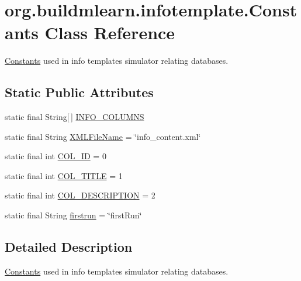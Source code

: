 \hypertarget{classorg_1_1buildmlearn_1_1infotemplate_1_1Constants}{}\section{org.\+buildmlearn.\+infotemplate.\+Constants Class Reference}
\label{classorg_1_1buildmlearn_1_1infotemplate_1_1Constants}


\hyperlink{classorg_1_1buildmlearn_1_1infotemplate_1_1Constants}{Constants} used in info template\textquotesingle{}s simulator relating databases.  


\subsection*{Static Public Attributes}
\begin{DoxyCompactItemize}
\item 
static final String\mbox{[}$\,$\mbox{]} \hyperlink{classorg_1_1buildmlearn_1_1infotemplate_1_1Constants_ab3f048dc159aa767ce63e2f4732ce323}{I\+N\+F\+O\+\_\+\+C\+O\+L\+U\+M\+NS}
\item 
static final String \hyperlink{classorg_1_1buildmlearn_1_1infotemplate_1_1Constants_a22968d39912d481f05334917ee2534a1}{X\+M\+L\+File\+Name} = \char`\"{}info\+\_\+content.\+xml\char`\"{}
\item 
static final int \hyperlink{classorg_1_1buildmlearn_1_1infotemplate_1_1Constants_acc412bcdafb8b030cc8054d02579ca63}{C\+O\+L\+\_\+\+ID} = 0
\item 
static final int \hyperlink{classorg_1_1buildmlearn_1_1infotemplate_1_1Constants_ae2a4192623b0846f515eb1e74e7ce486}{C\+O\+L\+\_\+\+T\+I\+T\+LE} = 1
\item 
static final int \hyperlink{classorg_1_1buildmlearn_1_1infotemplate_1_1Constants_a11b5b62ca7e7ebbd41327b09d7836397}{C\+O\+L\+\_\+\+D\+E\+S\+C\+R\+I\+P\+T\+I\+ON} = 2
\item 
static final String \hyperlink{classorg_1_1buildmlearn_1_1infotemplate_1_1Constants_a4d1fbe622b1f25a73bbb51eac2ff46a4}{firstrun} = \char`\"{}first\+Run\char`\"{}
\end{DoxyCompactItemize}


\subsection{Detailed Description}
\hyperlink{classorg_1_1buildmlearn_1_1infotemplate_1_1Constants}{Constants} used in info template\textquotesingle{}s simulator relating databases. 

